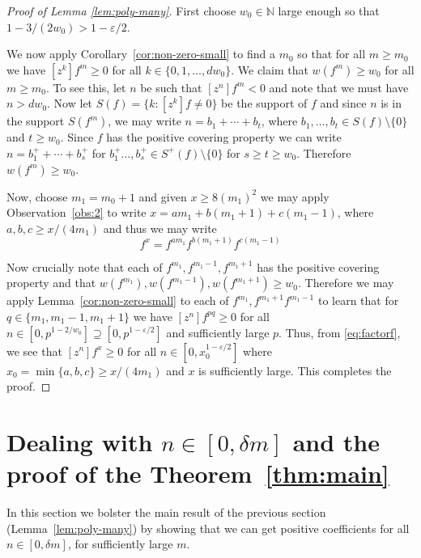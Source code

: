 \documentclass{daj}
\def\eps{\varepsilon}
\def\N{\mathbb{N}}
\theoremstyle{definition}
\theoremstyle{remark}
\begin{document}
\begin{proof}[Proof of Lemma \ref{lem:poly-many}]
	First choose $w_0\in \N$ large enough so that $1 - 3/(2w_0) > 1-\eps/2$. 
	
	We now apply Corollary~\ref{cor:non-zero-small} to find a $m_0$ so that for all $m \geq m_0$ we have $[z^k]f^{m} \geq 0$ for all $k \in \{0,1,\ldots, dw_0\}$. 
	We claim that $w(f^{m}) \geq w_0$ for all $m \geq m_0$. To see this, let $n$ be such that $[z^n]f^{m} < 0$ and note that we must have $n > dw_0$. 
	Now let $S(f) = \{ k : [z^k]f \not=0 \}$ be the support of $f$ and since $n$ is in the support $S(f^{m})$, 
	we may write $n = b_1 + \cdots + b_{t}$, where $b_1,\ldots,b_t \in S(f)\setminus \{0\}$ and $t \geq w_0$. Since $f$ has the positive covering property 
	we can write $n = b^+_1 + \cdots + b^+_{s}$ for $b_1^+ \ldots, b_s^+ \in S^+(f)\setminus \{0\}$ for $s \geq t \geq w_0$. Therefore $w(f^{m}) \geq w_0$.
	
	Now, choose $m_1 = m_0+1$ and 
	 given $x \geq 8(m_1)^2$ we may apply Observation~\ref{obs:2} to write $x = am_1 + b(m_1+1) + c(m_1-1)$, where $a,b,c \geq x/(4m_1)$ and thus we may write
	\begin{equation} \label{eq:factorf} f^{x} = f^{am_1}f^{b(m_1+1)}f^{c(m_1-1)}\end{equation}

	Now crucially note that each of $f^{m_1},f^{m_1-1},f^{m_1+1}$ has the positive covering property and that $w(f^{m_1}),w(f^{m_1-1}),w(f^{m_1+1}) \geq w_0$.
	Therefore we may apply Lemma~\ref{cor:non-zero-small}
	to each of $ f^{m_1}, f^{m_1+1} f^{m_1-1}$ to learn that for $ q \in \{m_1,m_1-1,m_1+1\}$
	we have $[z^n]f^{p q} \geq 0$ for all $n \in [0,p^{1-2/w_0}] \supseteq [0,p^{1-\eps/2}] $ and sufficiently large $p$. 
	Thus, from \eqref{eq:factorf}, we see that $[z^n]f^x \geq 0$ for all $n \in [0,x_0^{1-\eps/2}]$ where $x_0 = \min\{ a,b,c\} \geq x/(4m_1)$
	and $x$ is sufficiently large. This completes the proof.	
\end{proof}

\section{Dealing with $n \in [0,\delta m]$ and the proof of the Theorem~\ref{thm:main}}\label{sec:proof}

In this section we bolster the main result of the previous section (Lemma~\ref{lem:poly-many}) by showing that we can get positive coefficients for all $n \in [0,\delta m]$, for sufficiently large $m$.
\end{document}
